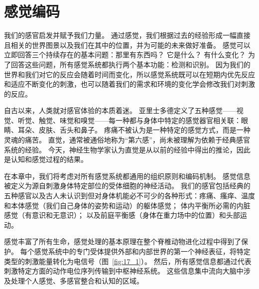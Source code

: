 \chapter{感觉编码} \label{chap:chap17}


我们的感官启发并赋予我们力量。 
通过感觉，我们根据过去的经验形成一幅直接且相关的世界图景以及我们在其中的位置，并为可能的未来做好准备。 
感觉可以立即回答三个持续存在的基本问题：那里有东西吗？ 它是什么？ 有什么变化？ 
为了回答这些问题，所有感觉系统都执行两个基本功能：检测和识别。 
因为我们的世界和我们对它的反应会随着时间而变化，所以感觉系统既可以在短期内优先反应和适应不断变化的刺激，也可以随着我们的需求和环境的变化学会修改我们对刺激的反应。


自古以来，人类就对感官体验的本质着迷。 
亚里士多德定义了五种感觉——视觉、听觉、触觉、味觉和嗅觉——每一种都与身体中特定的感觉器官相关联：眼睛、耳朵、皮肤、舌头和鼻子。 
疼痛不被认为是一种特定的感觉方式，而是一种灵魂的痛苦。 
直觉，通常被通俗地称为“第六感”，尚未被理解为依赖于经典感官系统的经验。 
今天，神经生物学家认为直觉是从以前的经验中得出的推论，因此是认知和感觉过程的结果。


在本章中，我们将考虑对所有感觉系统都通用的组织原则和编码机制。 
感觉信息被定义为源自刺激身体特定部位的受体细胞的神经活动。 
我们的感官包括经典的五种感官以及古人未认识到但对身体机能必不可少的各种形式：疼痛、瘙痒、温度和本体感觉（我们自己身体的姿势和运动）的躯体感觉； 
体内平衡所必需的内脏感觉（有意识和无意识）； 
以及前庭平衡感（身体在重力场中的位置）和头部运动。


感觉丰富了所有生命，感觉处理的基本原理在整个脊椎动物进化过程中得到了保护。
每个感觉系统中的专门受体提供外部和内部世界的第一个神经表征，将特定类型的刺激能量转化为电信号（图~\ref{fig:17_1}）。 
然后，所有感觉信息都通过代表刺激特定方面的动作电位序列传输到中枢神经系统。
这些信息集中流向大脑中涉及处理个人感觉、多感官整合和认知的区域。


